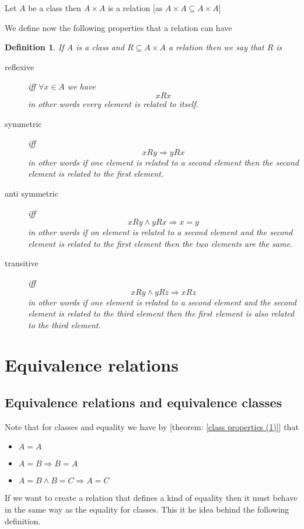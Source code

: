 \documentclass{book}
\newenvironment{itemizedot}{\begin{itemize} \renewcommand{\labelitemi}{$\bullet$}\renewcommand{\labelitemii}{$\bullet$}\renewcommand{\labelitemiii}{$\bullet$}\renewcommand{\labelitemiv}{$\bullet$}}{\end{itemize}}
\newtheorem{definition}{Definition}
{\theorembodyfont{\rmfamily}\newtheorem{example}{Example}}
\begin{document}
\begin{example}
  \label{relation trivial}Let $A$ be a class then $A \times A$ is a relation
  [as $A \times A \subseteq A \times A$]
\end{example}

We define now the following properties that a relation can have

\begin{definition}
  \label{relation properties}If $A$ is a class and $R \subseteq A \times A$ a
  relation then we say that $R$ is
  \begin{description}
    \item[reflexive] iff $\forall x \in A$ we have
    \[ x R x \]
    in other words every element is related to itself.
    
    \item[symmetric] iff
    \[ x R y \Rightarrow y R x \]
    in other words if one element is related to a second element then the
    second element is related to the first element.
    
    \item[anti symmetric] iff
    \[ x R y \wedge y R x \Rightarrow x = y \]
    in other words if on element is related to a second element and the second
    element is related to the first element then the two elements are the
    same.
    
    \item[transitive] iff
    \[ x R y \wedge y R z \Rightarrow x R z \]
    in other words if one element is related to a second element and the
    second element is related to the third element then the first element is
    also related to the third element.
  \end{description}
\end{definition}

\section{Equivalence relations}

\subsection{Equivalence relations and equivalence classes}

Note that for classes and equality we have by [theorem: \ref{class properties
(1)}] that
\begin{itemizedot}
  \item $A = A$
  
  \item $A = B \Rightarrow B = A$
  
  \item $A = B \wedge B = C \Rightarrow A = C$
\end{itemizedot}
If we want to create a relation that defines a kind of equality then it must
behave in the same way as the equality for classes. This it he idea behind the
following definition.
\end{document}
